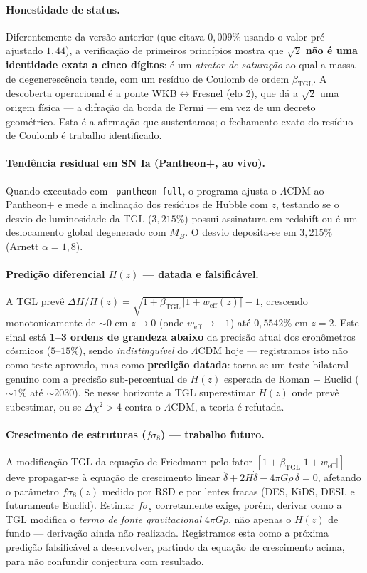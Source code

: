 \documentclass[12pt,a4paper]{article}
\newcommand{\betatgl}{\beta_{\text{TGL}}}
\newcommand{\TGL}{\textsc{TGL}}
\begin{document}
\paragraph{Honestidade de status.}
Diferentemente da versão anterior (que citava $0{,}009\%$ usando o valor
pré-ajustado $1{,}44$), a verificação de primeiros princípios mostra que
$\sqrt{2}$ \textbf{não é uma identidade exata a cinco dígitos}: é um
\emph{atrator de saturação} ao qual a massa de degenerescência tende, com um
resíduo de Coulomb de ordem $\betatgl$.  A descoberta operacional é a ponte
WKB$\leftrightarrow$Fresnel (elo 2), que dá a $\sqrt{2}$ uma origem física ---
a difração da borda de Fermi --- em vez de um decreto geométrico.  Esta é a
afirmação que sustentamos; o fechamento exato do resíduo de Coulomb é trabalho
identificado.

\paragraph{Tendência residual em SN Ia (Pantheon+, ao vivo).}
Quando executado com \texttt{--pantheon-full}, o programa ajusta o
$\Lambda$CDM ao Pantheon+ e mede a inclinação dos resíduos de Hubble com $z$,
testando se o desvio de luminosidade da \TGL{} ($3{,}215\%$) possui assinatura
em redshift ou é um deslocamento global degenerado com $M_B$.  O desvio
deposita-se em $3{,}215\%$ (Arnett $\alpha=1{,}8$).

\paragraph{Predição diferencial $H(z)$ --- datada e falsificável.}
A \TGL{} prevê $\Delta H/H(z) = \sqrt{1 + \betatgl\,|1 + w_{\text{eff}}(z)|} - 1$,
crescendo monotonicamente de $\sim 0$ em $z \to 0$ (onde $w_{\text{eff}} \to -1$)
até $0{,}5542\%$ em $z = 2$.  Este sinal está
\textbf{1--3 ordens de grandeza abaixo} da precisão atual dos cronômetros
cósmicos ($5$--$15\%$), sendo \emph{indistinguível} do $\Lambda$CDM hoje ---
registramos isto não como teste aprovado, mas como \textbf{predição datada}:
torna-se um teste bilateral genuíno com a precisão sub-percentual de $H(z)$
esperada de Roman $+$ Euclid ($\sim 1\%$ até $\sim 2030$).  Se nesse horizonte
a \TGL{} superestimar $H(z)$ onde prevê subestimar, ou se $\Delta\chi^2 > 4$
contra o $\Lambda$CDM, a teoria é refutada.

\paragraph{Crescimento de estruturas ($f\sigma_8$) --- trabalho futuro.}
A modificação \TGL{} da equação de Friedmann pelo fator
$[1 + \betatgl|1+w_{\text{eff}}|]$ deve propagar-se à equação de crescimento
linear $\ddot{\delta} + 2H\dot{\delta} - 4\pi G\rho\,\delta = 0$, afetando o
parâmetro $f\sigma_8(z)$ medido por RSD e por lentes fracas (DES, KiDS, DESI,
e futuramente Euclid).  Estimar $f\sigma_8$ corretamente exige, porém, derivar
como a \TGL{} modifica o \emph{termo de fonte gravitacional}
$4\pi G\rho$, não apenas o $H(z)$ de fundo --- derivação ainda não realizada.
Registramos esta como a próxima predição falsificável a desenvolver, partindo
da equação de crescimento acima, para não confundir conjectura com resultado.
\end{document}
